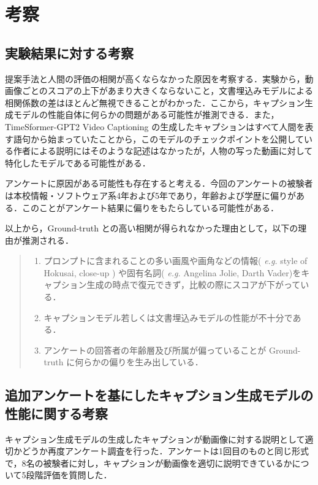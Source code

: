 \documentclass[11pt,a4j]{jreport}
\begin{document}


\section{考察}

\subsection{実験結果に対する考察}

提案手法と人間の評価の相関が高くならなかった原因を考察する．実験から，動画像ごとのスコアの上下があまり大きくならないこと，文書埋込みモデルによる相関係数の差はほとんど無視できることがわかった．ここから，キャプション生成モデルの性能自体に何らかの問題がある可能性が推測できる．また，TimeSformer-GPT2 Video Captioning の生成したキャプションはすべて人間を表す語句から始まっていたことから，このモデルのチェックポイントを公開している作者による説明にはそのような記述はなかったが，人物の写った動画に対して特化したモデルである可能性がある．

アンケートに原因がある可能性も存在すると考える．今回のアンケートの被験者は本校情報・ソフトウェア系4年および5年であり，年齢および学歴に偏りがある．このことがアンケート結果に偏りをもたらしている可能性がある．

以上から，Ground-truth との高い相関が得られなかった理由として，以下の理由が推測される．

\begin{quote}\begin{enumerate}
    \item プロンプトに含まれることの多い画風や画角などの情報( \textit{e.g.} style of Hokusai, close-up ) や固有名詞( \textit{e.g.} Angelina Jolie, Darth Vader)をキャプション生成の時点で復元できず，比較の際にスコアが下がっている．
    \item キャプションモデル若しくは文書埋込みモデルの性能が不十分である．
    \item アンケートの回答者の年齢層及び所属が偏っていることが Ground-truth に何らかの偏りを生み出している．
    \end{enumerate}\end{quote}

\subsection{追加アンケートを基にしたキャプション生成モデルの性能に関する考察}

キャプション生成モデルの生成したキャプションが動画像に対する説明として適切かどうか再度アンケート調査を行った．アンケートは1回目のものと同じ形式で，8名の被験者に対し，キャプションが動画像を適切に説明できているかについて5段階評価を質問した．
\end{document}
